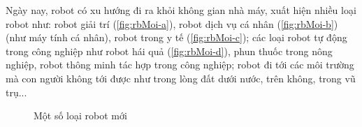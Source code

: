 Ngày nay, robot có xu hướng đi ra khỏi không gian nhà máy, xuất hiện nhiều loại robot như: robot giải trí (\figurename{\ref{fig:rbMoi-a}}), robot dịch vụ cá nhân (\figurename{\ref{fig:rbMoi-b}}) (như máy tính cá nhân), robot trong y tế (\figurename{\ref{fig:rbMoi-c}}); các loại robot tự động trong công nghiệp như robot hái quả (\figurename{\ref{fig:rbMoi-d}}), phun thuốc trong nông nghiệp, robot thông minh tác hợp trong công nghiệp; robot đi tới các môi trường mà con người không tới được như trong lòng đất dưới nước, trên không, trong vũ trụ...
\begin{figure}
	\centering
        \hspace{8pt}
	\hspace{8pt}
	\caption[]{Một số loại robot mới}
	\label{fig:rbMoi}
\end{figure}

